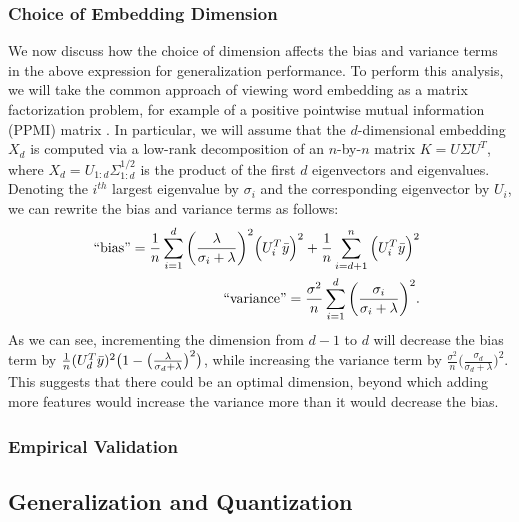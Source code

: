 \subsubsection{Choice of Embedding Dimension}
We now discuss how the choice of dimension affects the bias and variance terms in the above expression for generalization performance.
To perform this analysis, we will take the common approach of viewing word embedding as a matrix factorization problem, for example of a positive pointwise mutual information (PPMI) matrix \citep{levy14}.
In particular, we will assume that the $d$-dimensional embedding $X_d$ is computed via a low-rank decomposition of an $n$-by-$n$ matrix $K = U \Sigma U^T$, where $X_d = U_{1:d} \Sigma_{1:d}^{1/2}$ is the product of the first $d$ eigenvectors and eigenvalues.
Denoting the $i^{th}$ largest eigenvalue by $\sigma_i$ and the corresponding eigenvector by $U_i$, we can rewrite the bias and variance terms as follows:
\begin{eqnarray*}
\hspace{-0.2in}&&\text{``bias''} = \frac{1}{n}\sum_{i=1}^d \bigg(\frac{\lambda}{\sigma_i + \lambda}\bigg)^2 \Big(U_i^T \by \Big)^2 + \frac{1}{n}\sum_{i=d+1}^n \Big(U_i^T \by \Big)^2\\
\hspace{-0.2in}&&\text{``variance''} = \frac{\sigma^2}{n}\sum_{i=1}^d \bigg(\frac{\sigma_i}{\sigma_i + \lambda}\bigg)^2.
\end{eqnarray*}
As we can see, incrementing the dimension from $d-1$ to $d$ will decrease the bias term by $\frac{1}{n}(U_d^T \by)^2\big(1-\big(\frac{\lambda}{\sigma_d + \lambda}\big)^2\big)$,
while increasing the variance term by $\frac{\sigma^2}{n}\big(\frac{\sigma_d}{\sigma_d + \lambda}\big)^2$.
This suggests that there could be an optimal dimension, beyond which adding more features would increase the variance more than it would decrease the bias.

\subsubsection{Empirical Validation}

\subsection{Generalization and Quantization}
\label{sec:theory_quantization}

